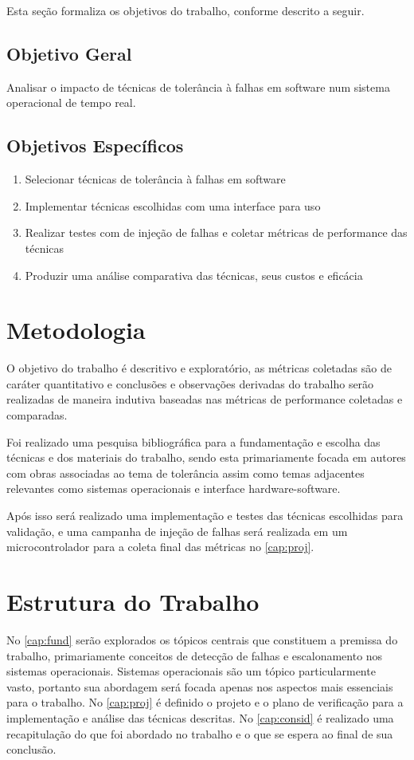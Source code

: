 Esta seção formaliza os objetivos do trabalho, conforme descrito a seguir.

\bigskip
\subsection{Objetivo Geral}

Analisar o impacto de técnicas de tolerância à falhas em software num sistema operacional de tempo real.

\bigskip
\subsection{Objetivos Específicos}

\begin{enumerate}
    \item Selecionar técnicas de tolerância à falhas em software
    \item Implementar técnicas escolhidas com uma interface para uso
    \item Realizar testes com de injeção de falhas e coletar métricas de performance das técnicas
    \item Produzir uma análise comparativa das técnicas, seus custos e eficácia
\end{enumerate}

\section{Metodologia}

O objetivo do trabalho é descritivo e exploratório, as métricas coletadas são de caráter quantitativo e conclusões e observações derivadas do trabalho serão realizadas de maneira indutiva baseadas nas métricas de performance coletadas e comparadas.

Foi realizado uma pesquisa bibliográfica para a fundamentação e escolha das técnicas e dos materiais do trabalho, sendo esta primariamente focada em autores com obras associadas ao tema de tolerância assim como temas adjacentes relevantes como sistemas operacionais e interface hardware-software.

Após isso será realizado uma implementação e testes das técnicas escolhidas para validação, e uma campanha de injeção de falhas será realizada em um microcontrolador para a coleta final das métricas no \autoref{cap:proj}.

\section{Estrutura do Trabalho}

No \autoref{cap:fund} serão explorados os tópicos centrais que constituem a premissa do trabalho, primariamente conceitos de detecção de falhas e escalonamento nos sistemas operacionais. Sistemas operacionais são um tópico particularmente vasto, portanto sua abordagem será focada apenas nos aspectos mais essenciais para o trabalho. No \autoref{cap:proj} é definido o projeto e o plano de verificação para a implementação e análise das técnicas descritas. No \autoref{cap:consid} é realizado uma recapitulação do que foi abordado no trabalho e o que se espera ao final de sua conclusão.


